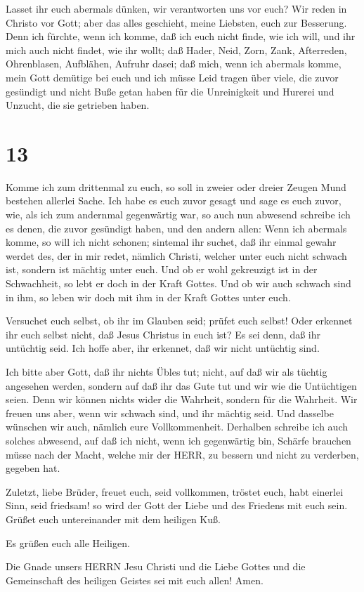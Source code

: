  Lasset ihr euch abermals dünken, wir verantworten uns vor
euch? Wir reden in Christo vor Gott; aber das alles geschieht, meine
Liebsten, euch zur Besserung.  Denn ich fürchte, wenn ich
komme, daß ich euch nicht finde, wie ich will, und ihr mich auch nicht
findet, wie ihr wollt; daß Hader, Neid, Zorn, Zank, Afterreden,
Ohrenblasen, Aufblähen, Aufruhr dasei;  daß mich, wenn ich
abermals komme, mein Gott demütige bei euch und ich müsse Leid tragen
über viele, die zuvor gesündigt und nicht Buße getan haben für die
Unreinigkeit und Hurerei und Unzucht, die sie getrieben haben.

\hypertarget{section-12}{%
\section{13}\label{section-12}}

 Komme ich zum drittenmal zu euch, so soll in zweier oder
dreier Zeugen Mund bestehen allerlei Sache.  Ich habe es
euch zuvor gesagt und sage es euch zuvor, wie, als ich zum andernmal
gegenwärtig war, so auch nun abwesend schreibe ich es denen, die zuvor
gesündigt haben, und den andern allen: Wenn ich abermals komme, so will
ich nicht schonen;  sintemal ihr suchet, daß ihr einmal
gewahr werdet des, der in mir redet, nämlich Christi, welcher unter euch
nicht schwach ist, sondern ist mächtig unter euch.  Und ob
er wohl gekreuzigt ist in der Schwachheit, so lebt er doch in der Kraft
Gottes. Und ob wir auch schwach sind in ihm, so leben wir doch mit ihm
in der Kraft Gottes unter euch.

 Versuchet euch selbst, ob ihr im Glauben seid; prüfet euch
selbst! Oder erkennet ihr euch selbst nicht, daß Jesus Christus in euch
ist? Es sei denn, daß ihr untüchtig seid.  Ich hoffe aber,
ihr erkennet, daß wir nicht untüchtig sind.

 Ich bitte aber Gott, daß ihr nichts Übles tut; nicht, auf
daß wir als tüchtig angesehen werden, sondern auf daß ihr das Gute tut
und wir wie die Untüchtigen seien.  Denn wir können nichts
wider die Wahrheit, sondern für die Wahrheit.  Wir freuen
uns aber, wenn wir schwach sind, und ihr mächtig seid. Und dasselbe
wünschen wir auch, nämlich eure Vollkommenheit.  Derhalben
schreibe ich auch solches abwesend, auf daß ich nicht, wenn ich
gegenwärtig bin, Schärfe brauchen müsse nach der Macht, welche mir der
HERR, zu bessern und nicht zu verderben, gegeben hat.

 Zuletzt, liebe Brüder, freuet euch, seid vollkommen,
tröstet euch, habt einerlei Sinn, seid friedsam! so wird der Gott der
Liebe und des Friedens mit euch sein.  Grüßet euch
untereinander mit dem heiligen Kuß.

 Es grüßen euch alle Heiligen.

 Die Gnade unsers HERRN Jesu Christi und die Liebe Gottes
und die Gemeinschaft des heiligen Geistes sei mit euch allen! Amen.
